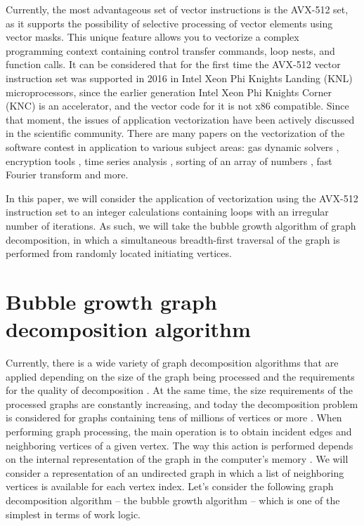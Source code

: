 \documentclass[
11pt,%
tightenlines,%
twoside,%
onecolumn,%
nofloats,%
nobibnotes,%
nofootinbib,%
superscriptaddress,%
noshowpacs,%
centertags]%
{revtex4}
\begin{document}
Currently, the most advantageous set of vector instructions is the AVX-512 set, as it supports the possibility of selective processing of vector elements using vector masks.
This unique feature allows you to vectorize a complex programming context containing control transfer commands, loop nests, and function calls.
It can be considered that for the first time the AVX-512 vector instruction set was supported in 2016 in Intel Xeon Phi Knights Landing (KNL) microprocessors, since the earlier generation Intel Xeon Phi Knights Corner (KNC) is an accelerator, and the vector code for it is not x86 compatible.
Since that moment, the issues of application vectorization have been actively discussed in the scientific community.
There are many papers on the vectorization of the software contest in application to various subject areas: gas dynamic solvers \cite{12-1Kulikov}, encryption tools \cite{12-2Buhrow}, time series analysis \cite{12-3Quislant}, sorting of an array of numbers \cite{12-4Blacher}, fast Fourier transform \cite{12-5Sansone} and more.

In this paper, we will consider the application of vectorization using the AVX-512 instruction set to an integer calculations containing loops with an irregular number of iterations.
As such, we will take the bubble growth algorithm of graph decomposition, in which a simultaneous breadth-first traversal of the graph is performed from randomly located initiating vertices.

\section{Bubble growth graph decomposition algorithm}

Currently, there is a wide variety of graph decomposition algorithms that are applied depending on the size of the graph being processed and the requirements for the quality of decomposition \cite{13Ayall}.
At the same time, the size requirements of the processed graphs are constantly increasing, and today the decomposition problem is considered for graphs containing tens of millions of vertices or more \cite{14Lee}.
When performing graph processing, the main operation is to obtain incident edges and neighboring vertices of a given vertex.
The way this action is performed depends on the internal representation of the graph in the computer's memory \cite{15Ahmed,16Salwasser}.
We will consider a representation of an undirected graph in which a list of neighboring vertices is available for each vertex index.
Let's consider the following graph decomposition algorithm -- the bubble growth algorithm -- which is one of the simplest in terms of work logic.
\end{document}
